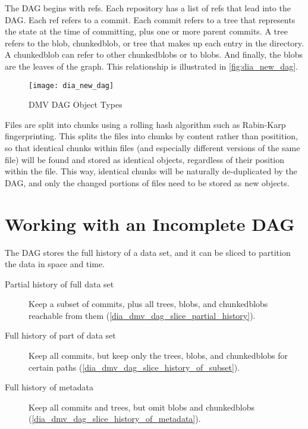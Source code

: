 The DAG begins with refs. Each repository has a list of refs that lead into the
DAG. Each ref refers to a \gls{commit}. Each \gls{commit} refers to a \gls{tree} that
represents the state at the time of committing, plus one or more parent
\glspl{commit}.
A \gls{tree} refers to the \gls{blob}, \gls{chunkedblob}, or \gls{tree} that
makes up each entry in the directory. A \gls{chunkedblob} can refer to other
\glspl{chunkedblob} or to \glspl{blob}. And finally, the \glspl{blob} are the
leaves of the graph. This relationship is illustrated in
\autoref{fig:dia_new_dag}.

\begin{figure}[]
    \centering
        \texttt{[image: dia\_new\_dag]}
    \caption{DMV DAG Object Types}
    \label{fig:dia_new_dag}
\end{figure}


Files are split into chunks using a rolling hash algorithm such as Rabin-Karp
fingerprinting\cite{rabin_karp_fingerprinting}. This splits the files into
chunks by content rather than positition, so that identical chunks within files
(and especially different versions of the same file) will be found and stored as
identical objects, regardless of their position within the file. This way,
identical chunks will be naturally de-duplicated by the DAG, and only the
changed portions of files need to be stored as new objects.

%


\section{Working with an Incomplete DAG}

The DAG stores the full history of a data set, and it can be sliced to partition
the data in space and time.

\begin{description}

    \item[Partial history of full data set] Keep a subset of \glspl{commit},
        plus all \glspl{tree}, \glspl{blob}, and \glspl{chunkedblob} reachable
        from them (\autoref{dia_dmv_dag_slice_partial_history}).

    \item[Full history of part of data set] Keep all \glspl{commit}, but keep
        only the \glspl{tree}, \glspl{blob}, and \glspl{chunkedblob} for certain
        paths (\autoref{dia_dmv_dag_slice_history_of_subset}).

    \item[Full history of metadata] Keep all \glspl{commit} and \glspl{tree},
        but omit \glspl{blob} and \glspl{chunkedblob}
        (\autoref{dia_dmv_dag_slice_history_of_metadata}).

\end{description}

